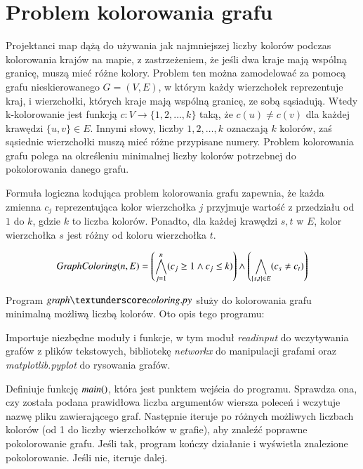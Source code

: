 \section{Problem kolorowania grafu}
Projektanci map dążą do używania jak najmniejszej liczby kolorów podczas
kolorowania krajów na mapie, z zastrzeżeniem, że jeśli dwa kraje mają wspólną
granicę, muszą mieć różne kolory. Problem ten można zamodelować za pomocą grafu
nieskierowanego $G = (V, E)$, w którym każdy wierzchołek reprezentuje kraj,
i wierzchołki, których kraje mają wspólną granicę, ze sobą sąsiadują.
Wtedy k-kolorowanie jest funkcją $c\colon V \to \{1, 2, …, k\}$ taką, że $c(u) \neq c(v)$ dla każdej krawędzi $\{u, v\} \in E$. 
Innymi słowy, liczby $1, 2, …, k$
oznaczają \(k\) kolorów, zaś sąsiednie wierzchołki muszą mieć różne przypisane
numery. Problem kolorowania grafu polega na określeniu minimalnej liczby kolorów
potrzebnej do pokolorowania danego grafu.

Formuła logiczna kodująca problem kolorowania grafu zapewnia, że każda zmienna \(c_j\) reprezentująca kolor wierzchołka \(j\) przyjmuje wartość z przedziału od \(1\) do \(k\), gdzie \(k\) to liczba kolorów. Ponadto, dla każdej krawędzi ${s, t}$ w \(E\), kolor wierzchołka \(s\) jest różny od koloru wierzchołka \(t\).

\begin{align*}
	{\mathit{GraphColoring}}(n, E) = \left( \bigwedge_{j=1}^{n} (c_j \geq 1 \land c_j \leq k) \right) \land 
	\left( \bigwedge_{\{s,t\} \in E} (c_s \neq c_t) \right)
\end{align*}

Program $\graphcoloring$ służy do kolorowania grafu minimalną możliwą liczbą kolorów. Oto opis tego programu:

Importuje niezbędne moduły i funkcje, w tym moduł \textit{read\textunderscore input} do wczytywania grafów z plików tekstowych, bibliotekę \textit{networkx} do manipulacji grafami oraz \textit{matplotlib.pyplot} do rysowania grafów.

Definiuje funkcję ${\mathit{main()}}$, która jest punktem wejścia do programu. Sprawdza ona, czy została podana prawidłowa liczba argumentów wiersza poleceń i wczytuje nazwę pliku zawierającego graf. Następnie iteruje po różnych możliwych liczbach kolorów (od 1 do liczby wierzchołków w grafie), aby znaleźć poprawne pokolorowanie grafu. Jeśli tak, program kończy działanie i wyświetla znalezione pokolorowanie. Jeśli nie, iteruje dalej.

